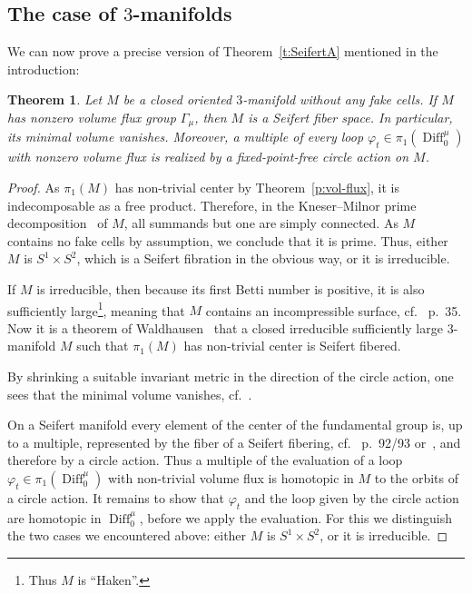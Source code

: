 \documentclass[12pt]{amsart}
\newtheorem{theorem}{Theorem}%
\theoremstyle{definition}
\theoremstyle{remark}
\newcommand\Diff{\operatorname{Diff}}
\begin{document}
\subsection{The case of $3$-manifolds}\label{3-folds}
We can now prove a precise version of Theorem~\ref{t:SeifertA} mentioned in the 
introduction:
\begin{theorem}\label{t:Seifert}
    Let $M$ be a closed oriented $3$-manifold without any fake cells.
    If $M$ has nonzero volume flux group $\Gamma_{\mu}$, then $M$ is a 
    Seifert fiber space. In particular, its minimal volume vanishes.
    Moreover, a multiple of every loop $\varphi_{t}\in\pi_{1}(\Diff^{\mu}_0)$ 
    with nonzero volume flux is realized by a fixed-point-free circle action on $M$. 
    \end{theorem}
\begin{proof}
    As $\pi_{1}(M)$ has non-trivial center by Theorem~\ref{p:vol-flux}, it 
    is indecomposable as a free product. Therefore, in the Kneser--Milnor 
    prime decomposition~\cite{M} of $M$, all summands but one are simply connected. As 
    $M$ contains no fake cells by assumption, we conclude that it is prime. Thus, 
    either $M$ is $S^{1}\times S^{2}$, which is a Seifert fibration in the 
    obvious way, or it is irreducible.
    
    If $M$ is irreducible, then because its first Betti number is 
    positive, it is also sufficiently large\footnote{Thus $M$ 
    is ``Haken''.}, meaning that $M$ contains an incompressible 
    surface, cf.~\cite{Jaco} p.~35. Now it is a theorem of 
    Waldhausen~\cite{W} that a closed irreducible sufficiently large 
    $3$-manifold $M$ such that $\pi_{1}(M)$ has non-trivial center is 
    Seifert fibered.
    
    By shrinking a suitable invariant metric in the direction of the circle 
    action, one sees that the minimal volume vanishes, 
    cf.~\cite{Gromov}.
    
    On a Seifert manifold every element of the center of the 
    fundamental group is, up to a multiple, represented by the fiber 
    of a Seifert fibering, cf.~\cite{Jaco} p.~92/93 or~\cite{Scott}, and 
    therefore by a circle action. Thus a multiple of the evaluation of a loop 
    $\varphi_{t}\in\pi_{1}(\Diff^{\mu}_0)$ with non-trivial volume flux is homotopic
    in $M$ to the orbits of a circle action. It remains to show that $\varphi_{t}$ 
    and the loop given by the circle action are homotopic in $\Diff^{\mu}_0$, before 
    we apply the evaluation. For this we distinguish the two cases we encountered
    above: either $M$ is $S^{1}\times S^{2}$, or it is irreducible.
    

\end{proof}
\end{document}
